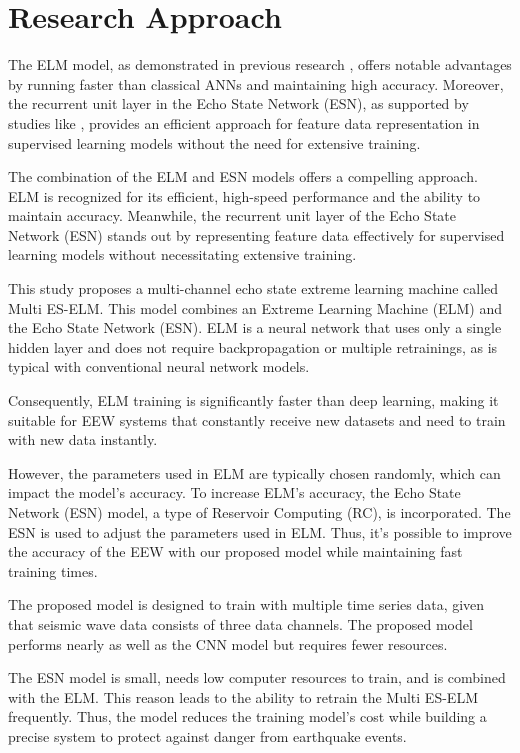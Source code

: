 \chapter{Research Approach}\label{Chap:ResearchApproach}

The ELM model, as demonstrated in previous research \cite{salam2021earthquake, asim2017earthquake}, offers notable advantages by running faster than classical ANNs and maintaining high accuracy. Moreover, the recurrent unit layer in the Echo State Network (ESN), as supported by studies like \cite{cucchi2022hands, bianchi2020reservoir}, provides an efficient approach for feature data representation in supervised learning models without the need for extensive training.

The combination of the ELM and ESN models offers a compelling approach. ELM is recognized for its efficient, high-speed performance and the ability to maintain accuracy. Meanwhile, the recurrent unit layer of the Echo State Network (ESN) stands out by representing feature data effectively for supervised learning models without necessitating extensive training.

This study proposes a multi-channel echo state extreme learning machine called Multi ES-ELM. This model combines an Extreme Learning Machine (ELM) and the Echo State Network (ESN). ELM is a neural network that uses only a single hidden layer and does not require backpropagation or multiple retrainings, as is typical with conventional neural network models. 

Consequently, ELM training is significantly faster than deep learning, making it suitable for EEW systems that constantly receive new datasets and need to train with new data instantly. 

However, the parameters used in ELM are typically chosen randomly, which can impact the model's accuracy. To increase ELM's accuracy, the Echo State Network (ESN) model, a type of Reservoir Computing (RC), is incorporated. The ESN is used to adjust the parameters used in ELM. Thus, it's possible to improve the accuracy of the EEW with our proposed model while maintaining fast training times. 

The proposed model is designed to train with multiple time series data, given that seismic wave data consists of three data channels. The proposed model performs nearly as well as the CNN model but requires fewer resources.

The ESN model is small, needs low computer resources to train, and is combined with the ELM. This reason leads to the ability to retrain the Multi ES-ELM frequently. Thus, the model reduces the training model's cost while building a precise system to protect against danger from earthquake events.

